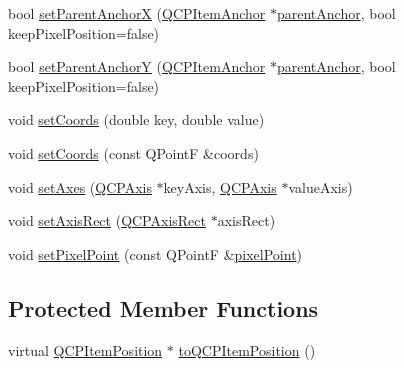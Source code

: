 \begin{DoxyCompactItemize}
\item 
bool \mbox{\hyperlink{class_q_c_p_item_position_add71461a973927c74e42179480916d9c}{set\+Parent\+AnchorX}} (\mbox{\hyperlink{class_q_c_p_item_anchor}{Q\+C\+P\+Item\+Anchor}} $\ast$\mbox{\hyperlink{class_q_c_p_item_position_a0a87f9dce1af6cc9b510785991bcf1c6}{parent\+Anchor}}, bool keep\+Pixel\+Position=false)
\item 
bool \mbox{\hyperlink{class_q_c_p_item_position_add5ec1db9d19cec58a3b5c9e0a0c3f9d}{set\+Parent\+AnchorY}} (\mbox{\hyperlink{class_q_c_p_item_anchor}{Q\+C\+P\+Item\+Anchor}} $\ast$\mbox{\hyperlink{class_q_c_p_item_position_a0a87f9dce1af6cc9b510785991bcf1c6}{parent\+Anchor}}, bool keep\+Pixel\+Position=false)
\item 
void \mbox{\hyperlink{class_q_c_p_item_position_aa988ba4e87ab684c9021017dcaba945f}{set\+Coords}} (double key, double value)
\item 
void \mbox{\hyperlink{class_q_c_p_item_position_acc70b3abc143287f806e5f154e5e07b0}{set\+Coords}} (const Q\+PointF \&coords)
\item 
void \mbox{\hyperlink{class_q_c_p_item_position_a2185f45c75ac8cb9be89daeaaad50e37}{set\+Axes}} (\mbox{\hyperlink{class_q_c_p_axis}{Q\+C\+P\+Axis}} $\ast$key\+Axis, \mbox{\hyperlink{class_q_c_p_axis}{Q\+C\+P\+Axis}} $\ast$value\+Axis)
\item 
void \mbox{\hyperlink{class_q_c_p_item_position_a0cd9b326fb324710169e92e8ca0041c2}{set\+Axis\+Rect}} (\mbox{\hyperlink{class_q_c_p_axis_rect}{Q\+C\+P\+Axis\+Rect}} $\ast$axis\+Rect)
\item 
void \mbox{\hyperlink{class_q_c_p_item_position_ab404e56d9ac2ac2df0382c57933a71ef}{set\+Pixel\+Point}} (const Q\+PointF \&\mbox{\hyperlink{class_q_c_p_item_position_a6cad070c22801295231f5bd6045afe70}{pixel\+Point}})
\end{DoxyCompactItemize}
\subsection*{Protected Member Functions}
\begin{DoxyCompactItemize}
\item 
virtual \mbox{\hyperlink{class_q_c_p_item_position}{Q\+C\+P\+Item\+Position}} $\ast$ \mbox{\hyperlink{class_q_c_p_item_position_a577a7efc601df85a20b3e709d1ac320e}{to\+Q\+C\+P\+Item\+Position}} ()
\end{DoxyCompactItemize}
